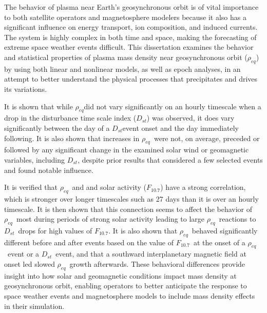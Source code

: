 \documentclass[11 pt]{GMUDissertation}
\newcommand{\req}{\ensuremath{\rho_{eq}}} %
\newcommand{\dst}{\ensuremath{D_{st}}} %
\newcommand{\f}{\ensuremath{F_{10.7}}} %
\begin{document}

\tableofcontents

\listoftables

\listoffigures







\abstractpage


The behavior of plasma near Earth's geosynchronous orbit is of vital importance to both satellite operators and magnetosphere modelers because it also has a significant influence on energy transport, ion composition, and induced currents. The system is highly complex in both time and space, making the forecasting of extreme space weather events difficult. This dissertation examines the behavior and statistical properties of plasma mass density near geosynchronous orbit (\req) by using both linear and nonlinear models, as well as epoch analyses, in an attempt to better understand the physical processes that precipitates and drives its variations. 

It is shown that while \req did not vary significantly on an hourly timescale when a drop in the disturbance time scale index (\dst) was observed, it does vary significantly between the day of a \dst event onset and the day immediately following. It is also shown that increases in \req\ were not, on average, preceded or followed by any significant change in the examined solar wind or geomagnetic variables, including \dst, despite prior results that considered a few selected events and found notable influence. 

%

\abstractmultiplepage


It is verified that \req\ and and solar activity (\f) have a strong correlation, which is stronger over longer timescales such as 27 days than it is over an hourly timescale. It is then shown that this connection seems to affect the behavior of \req\ most during periods of strong solar activity leading to large \req\ reactions to \dst\ drops for high values of \f.  It is also shown that \req\ behaved significantly different before and after events based on the value of \f\ at the onset of a \req\ event or a \dst\ event, and that a southward interplanetary magnetic field at onset led slowed \req\ growth afterwards. These behavioral differences provide insight into how solar and geomagnetic conditions impact mass density at geosynchronous orbit, enabling operators to better anticipate the response to space weather events and magnetosphere models to include mass density effects in their simulation.
\end{document}
